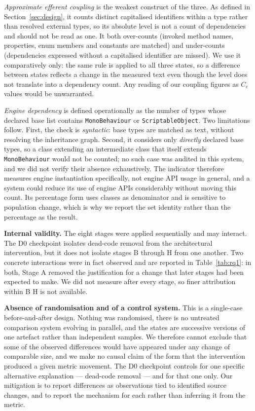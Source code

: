 \documentclass{sbc2019}%
\begin{document}
\emph{Approximate efferent coupling} is the weakest construct of the three. As
defined in Section~\ref{sec:design}, it counts distinct capitalised identifiers
within a type rather than resolved external types, so its absolute level is not
a count of dependencies and should not be read as one. It both over-counts
(invoked method names, properties, enum members and constants are matched) and
under-counts (dependencies expressed without a capitalised identifier are
missed). We use it comparatively only: the same rule is applied to all three
states, so a difference between states reflects a change in the measured text
even though the level does not translate into a dependency count. Any reading of
our coupling figures as $C_e$ values would be unwarranted.

\emph{Engine dependency} is defined operationally as the number of types whose
declared base list contains \texttt{MonoBehaviour} or \texttt{ScriptableObject}.
Two limitations follow. First, the check is \emph{syntactic}: base types are
matched as text, without resolving the inheritance graph. Second, it considers
only \emph{directly} declared base types, so a class extending an intermediate
class that itself extends \texttt{MonoBehaviour} would not be counted; no such
case was audited in this system, and we did not verify their absence
exhaustively. The indicator therefore measures engine instantiation
specifically, not engine API usage in general, and a system could reduce its
use of engine APIs considerably without moving this count. Its percentage form
uses classes as denominator and is sensitive to population change, which is why
we report the set identity rather than the percentage as the result.

\medskip\noindent\textbf{Internal validity.} The eight stages were applied
sequentially and may interact. The D0 checkpoint isolates dead-code removal from
the architectural intervention, but it does not isolate stages B through H from
one another. Two concrete interactions were in fact observed and are reported in
Table~\ref{tab:rq1}: in both, Stage A removed the justification for a change
that later stages had been expected to make. We did not measure after every
stage, so finer attribution within B\textendash{} H is not available.

\medskip\noindent\textbf{Absence of randomisation and of a control system.}
This is a single-case before-and-after design. Nothing was randomised, there is
no untreated comparison system evolving in parallel, and the states are
successive versions of one artefact rather than independent samples. We
therefore cannot exclude that some of the observed differences would have
appeared under any change of comparable size, and we make no causal claim of the
form that the intervention produced a given metric movement. The D0 checkpoint
controls for one specific alternative explanation --- dead-code removal --- and for
that one only. Our mitigation is to report differences as observations tied to
identified source changes, and to report the mechanism for each rather than
inferring it from the metric.
\end{document}
